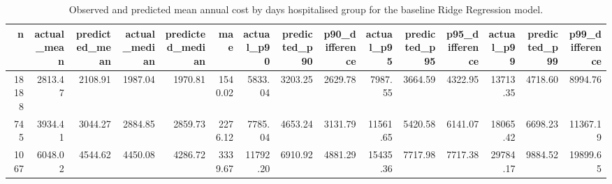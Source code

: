 \begin{table}
\caption{Observed and predicted mean annual cost by days hospitalised group for the baseline Ridge Regression model.}
\label{tab:03-ridge-group-summary-days-hospitalised}
\begin{tabular}{rrrrrrrrrrrrrrr}
\toprule
n & actual_mean & predicted_mean & actual_median & predicted_median & mae & actual_p90 & predicted_p90 & p90_difference & actual_p95 & predicted_p95 & p95_difference & actual_p99 & predicted_p99 & p99_difference \\
\midrule
18188 & 2813.47 & 2108.91 & 1987.04 & 1970.81 & 1540.02 & 5833.04 & 3203.25 & 2629.78 & 7987.55 & 3664.59 & 4322.95 & 13713.35 & 4718.60 & 8994.76 \\
745 & 3934.41 & 3044.27 & 2884.85 & 2859.73 & 2276.12 & 7785.04 & 4653.24 & 3131.79 & 11561.65 & 5420.58 & 6141.07 & 18065.42 & 6698.23 & 11367.19 \\
1067 & 6048.02 & 4544.62 & 4450.08 & 4286.72 & 3339.67 & 11792.20 & 6910.92 & 4881.29 & 15435.36 & 7717.98 & 7717.38 & 29784.17 & 9884.52 & 19899.65 \\
\bottomrule
\end{tabular}
\end{table}

